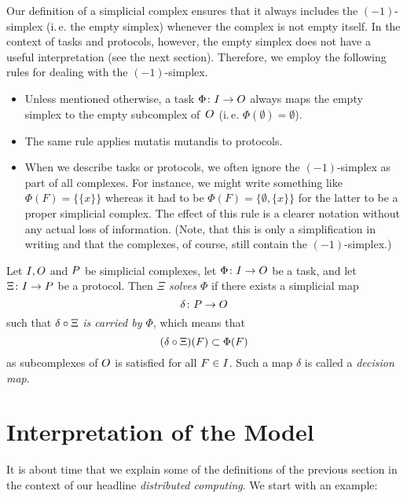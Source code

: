 \begin{thConvention}
    Our definition of a simplicial complex ensures that it always includes the
    $(-1)$-simplex (i.\,e. the empty simplex) whenever the complex is not empty
    itself. In the context of tasks and protocols, however, the empty simplex
    does not have a useful interpretation (see the next section). Therefore, we
    employ the following rules for dealing with the $(-1)$-simplex.
    \begin{itemize}
        \item
            Unless mentioned otherwise, a task $\Phi\colon I\to O$ always
            maps the empty simplex to the empty subcomplex of~$O$ (i.\,e.
            $\Phi(\emptyset) = \emptyset$).
            
        \item
            The same rule applies mutatis mutandis to protocols.
            
        \item
            When we describe tasks or protocols, we often ignore the
            $(-1)$-simplex as part of all complexes. For instance,
            we might write something like $\Phi(F) = \{\{x\}\}$ whereas
            it had to be $\Phi(F) = \{\emptyset,\{x\}\}$ for the
            latter to be a proper simplicial complex. The effect of
            this rule is a clearer notation without any actual loss
            of information. (Note, that this is only a simplification
            in writing and that the complexes, of course, still contain
            the $(-1)$-simplex.)
    \end{itemize}
\end{thConvention}

\begin{thDef}
    Let $I,O$ and $P$ be simplicial complexes,
    let $\Phi\colon I\to O$ be a task,
    and let $\Xi\colon I\to P$ be a protocol.
    Then \emph{$\Xi$ solves $\Phi$} if there exists a simplicial map
    \[ \delta\colon P\to O \] 
    such that $\delta\after\Xi$ \emph{is carried by $\Phi$},
    which means that
    \[ (\delta\after\Xi)(F) \subset \Phi(F) \]
    as subcomplexes of $O$ is satisfied for all $F\in I$.
    Such a map $\delta$ is called a \emph{decision map}.
\end{thDef}

\section{Interpretation of the Model}
It is about time that we explain some of the definitions of the previous
section in the context of our headline \emph{distributed computing}.
We start with an example:

